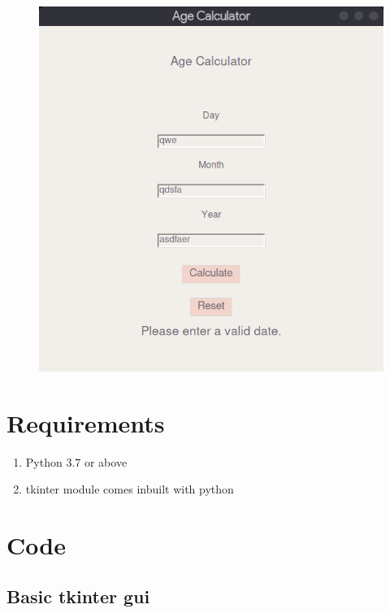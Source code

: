 \documentclass[11pt]{article}
\begin{document}
\begin{figure}[H]
    \centering
    \includegraphics[width=.55\textwidth]{Screenshot_on_2023-04-24_at_11-48-21.png}
    \caption{}
\end{figure}

\section{Requirements}
\begin{enumerate}
    \item Python 3.7 or above
    \item tkinter module comes inbuilt with python
\end{enumerate}

\section{Code}

    \hypertarget{basic-tkinter-gui}{%
\subsection{Basic tkinter gui}\label{basic-tkinter-gui}}
\end{document}
